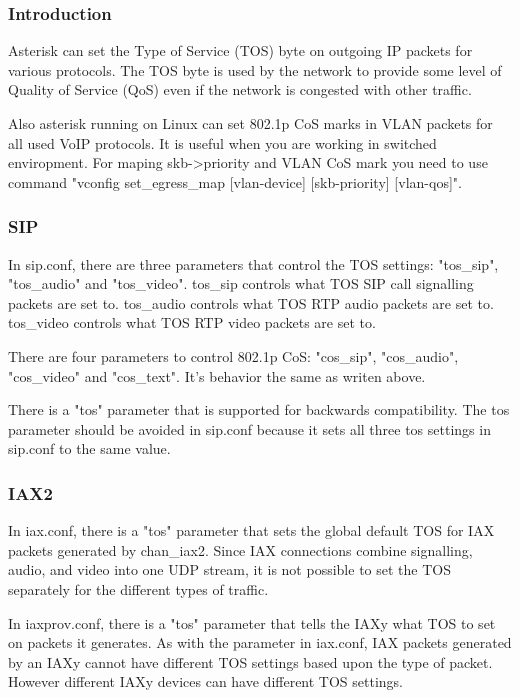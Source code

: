 \subsubsection{Introduction}

Asterisk can set the Type of Service (TOS) byte on outgoing IP packets
for various protocols.  The TOS byte is used by the network to provide
some level of Quality of Service (QoS) even if the network is
congested with other traffic. 

Also asterisk running on Linux can set 802.1p CoS marks in VLAN packets 
for all used VoIP protocols. It is useful when you are working in switched 
enviropment. For maping skb->priority and VLAN CoS mark you need to use 
command "vconfig set_egress_map [vlan-device] [skb-priority] [vlan-qos]".

\subsubsection{SIP}

In sip.conf, there are three parameters that control the TOS settings:
"tos\_sip", "tos\_audio" and "tos\_video". tos\_sip controls what TOS SIP 
call signalling packets are set to.  tos\_audio controls what TOS RTP audio
packets are set to.  tos\_video controls what TOS RTP video packets are
set to.  

There are four parameters to control 802.1p CoS: "cos\_sip", "cos\_audio", 
"cos\_video" and "cos\_text". It's behavior the same as writen above.

There is a "tos" parameter that is supported for backwards
compatibility.  The tos parameter should be avoided in sip.conf
because it sets all three tos settings in sip.conf to the same value.

\subsubsection{IAX2}
In iax.conf, there is a "tos" parameter that sets the global default TOS
for IAX packets generated by chan\_iax2.  Since IAX connections combine
signalling, audio, and video into one UDP stream, it is not possible
to set the TOS separately for the different types of traffic.

In iaxprov.conf, there is a "tos" parameter that tells the IAXy what TOS
to set on packets it generates.  As with the parameter in iax.conf,
IAX packets generated by an IAXy cannot have different TOS settings
based upon the type of packet.  However different IAXy devices can
have different TOS settings.

